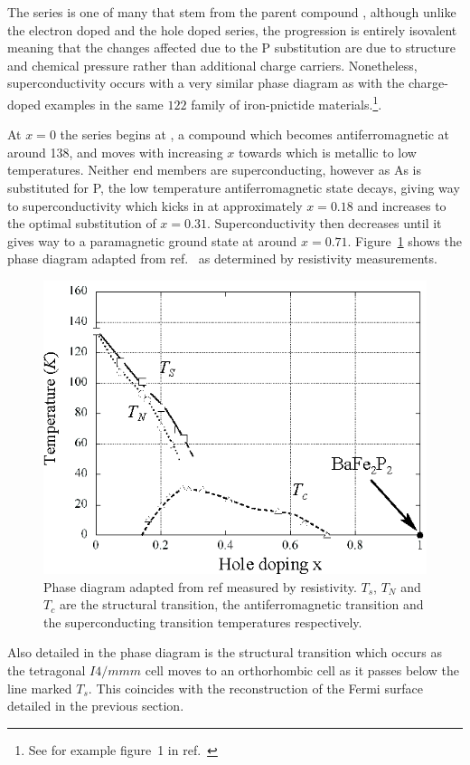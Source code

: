 The \BaFeAsP{} series is one of many that stem from the parent compound \BaFeAs, although unlike the electron doped \BaCoFeAs{} and the hole doped \BaKFeAs{} series, the \BaFeAsP{} progression is entirely isovalent meaning that the changes affected due to the P substitution are due to structure and chemical pressure rather than additional charge carriers. Nonetheless, superconductivity occurs with a very similar phase diagram as with the charge-doped examples in the same $122$ family of iron-pnictide materials.\footnote{See for example figure~1 in ref.~\cite{Paglione2010}}. 

At $x=0$ the \BaFeAsP{} series begins at \BaFeAs, a compound which becomes antiferromagnetic at around \unit{138}{\kelvin}, and moves with increasing $x$ towards \BaFeP{} which is metallic to low temperatures. Neither end members are superconducting, however as As is substituted for P, the low temperature antiferromagnetic state decays, giving way to superconductivity which kicks in at approximately $x=0.18$ and increases to the optimal substitution of $x=0.31$. Superconductivity then decreases until it gives way to a paramagnetic ground state at around $x=0.71$. Figure~\ref{Fig:Intro:PhaseDiagram} shows the phase diagram adapted from ref.~\cite{Nakai2010a} as determined by resistivity measurements. 
\begin{figure}[htbp]
    \begin{center}
        \includegraphics[scale=1.0]{Chapter-Introduction/Figures/PhaseDiagram/PhaseDiagram}
        \caption{Phase diagram adapted from ref \cite{Nakai2010a} measured by resistivity. $T_s$, $T_N$ and $T_c$ are the structural transition, the antiferromagnetic transition and the superconducting transition temperatures respectively.}
        \label{Fig:Intro:PhaseDiagram}
    \end{center}
\end{figure}
Also detailed in the phase diagram is the structural transition which occurs as the tetragonal $I4/mmm$ cell moves to an orthorhombic cell as it passes below the line marked $T_s$. This coincides with the reconstruction of the Fermi surface detailed in the previous section.

